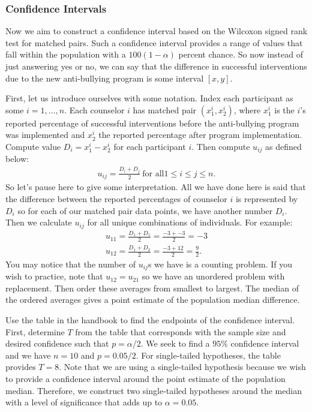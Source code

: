 \subsubsection{Confidence Intervals}

Now we aim to construct a confidence interval based on the Wilcoxon signed rank test for matched pairs. Such a confidence interval provides a range of values that fall within the population with a $100(1 - \alpha)$ percent chance. So now instead of just answering yes or no, we can say that the difference in successful interventions due to the new anti-bullying program is some interval $[x,y]$.

First, let us introduce ourselves with some notation. Index each participant as some $i = 1,\dots,n$. Each counselor $i$ has matched pair $(x_{1}^{i},x_{2}^{i})$, where $x_{1}^{i}$ is the $i$'s reported percentage of successful interventions before the anti-bullying program was implemented and $x_{2}^{i}$ the reported percentage after program implementation. Compute value $D_i = x_{1}^{i} - x_{2}^{i}$ for each participant $i$. Then compute $u_{ij}$ as defined below:
\begin{align*}
    u_{ij} = \frac{D_i + D_j}{2}\ \text{for all} 1 \leq i \leq j \leq n.
\end{align*}
So let's pause here to give some interpretation. All we have done here is said that the difference between the reported percentages of counselor $i$ is represented by $D_i$ so for each of our matched pair data points, we have another number $D_i$. Then we calculate $u_{ij}$ for all unique combinations of individuals. For example:
\begin{align*}
    u_{11} = \frac{D_1 + D_1}{2} = \frac{-3 + -3}{2} = -3 \\
    u_{12} = \frac{D_1 + D_2}{2} = \frac{-3 + 12}{2} = \frac{9}{2}.
\end{align*}
You may notice that the number of $u_{ij}$s we have is a counting problem. If you wish to practice, note that $u_{12} = u_{21}$ so we have an unordered problem with replacement. Then order these averages from smallest to largest. The median of the ordered averages gives a point estimate of the population median difference.

Use the table in the handbook to find the endpoints of the confidence interval. First, determine $T$ from the table that corresponds with the sample size and desired confidence such that $p = \alpha/2$. We seek to find a $95\%$ confidence interval and we have $n = 10$ and $p = 0.05/2$. For single-tailed hypotheses, the table provides $T = 8$. Note that we are using a single-tailed hypothesis because we wish to provide a confidence interval around the point estimate of the population median. Therefore, we construct two single-tailed hypotheses around the median with a level of significance that adds up to $\alpha = 0.05$.

